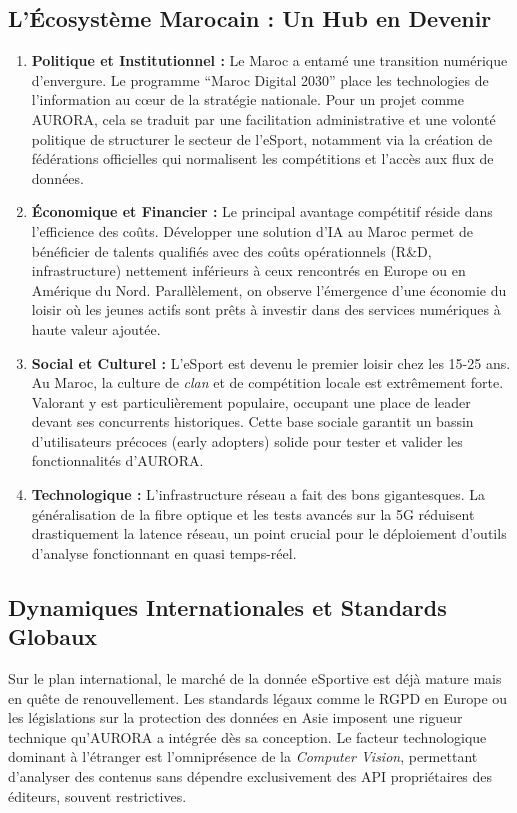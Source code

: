 \documentclass[a4paper,11pt]{article}
\begin{document}
\subsection{L'Écosystème Marocain : Un Hub en Devenir}
\begin{enumerate}[label=\alph*., leftmargin=1cm]
    \item \textbf{Politique et Institutionnel :} Le Maroc a entamé une transition numérique d'envergure. Le programme \enquote{Maroc Digital 2030} place les technologies de l'information au cœur de la stratégie nationale. Pour un projet comme AURORA, cela se traduit par une facilitation administrative et une volonté politique de structurer le secteur de l'eSport, notamment via la création de fédérations officielles qui normalisent les compétitions et l'accès aux flux de données.
    
    \item \textbf{Économique et Financier :} Le principal avantage compétitif réside dans l'efficience des coûts. Développer une solution d'IA au Maroc permet de bénéficier de talents qualifiés avec des coûts opérationnels (R\&D, infrastructure) nettement inférieurs à ceux rencontrés en Europe ou en Amérique du Nord. Parallèlement, on observe l'émergence d'une économie du loisir où les jeunes actifs sont prêts à investir dans des services numériques à haute valeur ajoutée.
    
    \item \textbf{Social et Culturel :} L'eSport est devenu le premier loisir chez les 15-25 ans. Au Maroc, la culture de \textit{clan} et de compétition locale est extrêmement forte. Valorant y est particulièrement populaire, occupant une place de leader devant ses concurrents historiques. Cette base sociale garantit un bassin d'utilisateurs précoces (early adopters) solide pour tester et valider les fonctionnalités d'AURORA.
    
    \item \textbf{Technologique :} L'infrastructure réseau a fait des bons gigantesques. La généralisation de la fibre optique et les tests avancés sur la 5G réduisent drastiquement la latence réseau, un point crucial pour le déploiement d'outils d'analyse fonctionnant en quasi temps-réel.
\end{enumerate}

\subsection{Dynamiques Internationales et Standards Globaux}
Sur le plan international, le marché de la donnée eSportive est déjà mature mais en quête de renouvellement. Les standards légaux comme le RGPD en Europe ou les législations sur la protection des données en Asie imposent une rigueur technique qu'AURORA a intégrée dès sa conception. Le facteur technologique dominant à l'étranger est l'omniprésence de la \textit{Computer Vision}, permettant d'analyser des contenus sans dépendre exclusivement des API propriétaires des éditeurs, souvent restrictives.
\end{document}
